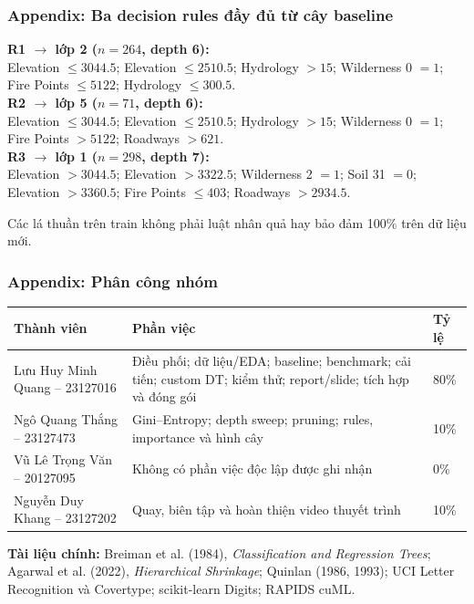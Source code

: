 \documentclass[aspectratio=169,12pt]{beamer}
\newcommand{\memberone}{Lưu Huy Minh Quang -- 23127016}
\newcommand{\membertwo}{Ngô Quang Thắng -- 23127473}
\newcommand{\memberthree}{Vũ Lê Trọng Văn -- 20127095}
\newcommand{\memberfour}{Nguyễn Duy Khang -- 23127202}
\begin{document}
\begin{frame}
  \frametitle{Appendix: Ba decision rules đầy đủ từ cây baseline}
  \scriptsize
  \textbf{R1 $\rightarrow$ lớp 2 ($n=264$, depth 6):}\\
  Elevation $\leq3044.5$; Elevation $\leq2510.5$; Hydrology $>15$; Wilderness 0 $=1$; Fire Points $\leq5122$; Hydrology $\leq300.5$.\\[0.30cm]

  \textbf{R2 $\rightarrow$ lớp 5 ($n=71$, depth 6):}\\
  Elevation $\leq3044.5$; Elevation $\leq2510.5$; Hydrology $>15$; Wilderness 0 $=1$; Fire Points $>5122$; Roadways $>621$.\\[0.30cm]

  \textbf{R3 $\rightarrow$ lớp 1 ($n=298$, depth 7):}\\
  Elevation $>3044.5$; Elevation $>3322.5$; Wilderness 2 $=1$; Soil 31 $=0$; Elevation $>3360.5$; Fire Points $\leq403$; Roadways $>2934.5$.\\[0.35cm]

  \begin{tcolorbox}[riskbox,width=0.92\textwidth,top=1mm,bottom=1mm]
    \centering
    Các lá thuần trên train không phải luật nhân quả hay bảo đảm 100\% trên dữ liệu mới.
  \end{tcolorbox}
\end{frame}

\begin{frame}
  \frametitle{Appendix: Phân công nhóm}
  \scriptsize
  \begin{tabularx}{\textwidth}{@{}L{3.2cm}Y L{1.1cm}@{}}
    \toprule
    \textbf{Thành viên} & \textbf{Phần việc} & \textbf{Tỷ lệ} \\
    \midrule
    \memberone & Điều phối; dữ liệu/EDA; baseline; benchmark; cải tiến; custom DT; kiểm thử; report/slide; tích hợp và đóng gói & 80\% \\
    \membertwo & Gini--Entropy; depth sweep; pruning; rules, importance và hình cây & 10\% \\
    \memberthree & Không có phần việc độc lập được ghi nhận & 0\% \\
    \memberfour & Quay, biên tập và hoàn thiện video thuyết trình & 10\% \\
    \bottomrule
  \end{tabularx}
  \par\vspace{0.32cm}
  \textbf{Tài liệu chính:} Breiman et al. (1984), \textit{Classification and Regression Trees}; Agarwal et al. (2022), \textit{Hierarchical Shrinkage}; Quinlan (1986, 1993); UCI Letter Recognition và Covertype; scikit-learn Digits; RAPIDS cuML.
\end{frame}
\end{document}
